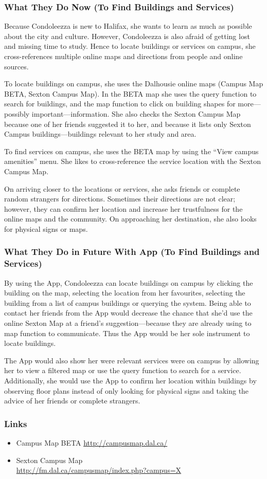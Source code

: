 \documentclass{article}
\begin{document}
\subsubsection{What They Do Now (To Find Buildings and Services)}

Because Condoleezza is new to Halifax, she wants to learn as much as possible
about the city and culture. However, Condoleezza is also afraid of getting lost
and missing time to study. Hence to locate buildings or services on campus, she
cross-references multiple online maps and directions from people and online
sources. 

To locate buildings on campus, she uses the Dalhousie online maps (Campus Map
BETA, Sexton Campus Map). In the BETA map she uses the query function to search
for buildings, and the map function to click on building shapes for
more—possibly important—information. She also checks the Sexton Campus Map
because one of her friends suggested it to her, and because it lists only Sexton
Campus buildings—buildings relevant to her study and area. 

To find services on campus, she uses the BETA map by using the “View campus
amenities” menu. She likes to cross-reference the service location with the
Sexton Campus Map.

On arriving closer to the locations or services, she asks friends or complete
random strangers for directions. Sometimes their directions are not clear;
however, they can confirm her location and increase her trustfulness for the
online maps and the community. On approaching her destination, she also looks
for physical signs or maps.

\subsubsection{What They Do in Future With App (To Find Buildings and Services)}

By using the App, Condoleezza can locate buildings on campus by clicking the
building on the map, selecting the location from her favourites, selecting the
building from a list of campus buildings or querying the system. Being able to
contact her friends from the App would decrease the chance that she’d use the
online Sexton Map at a friend’s suggestion—because they are already using to map
function to communicate. Thus the App would be her sole instrument to locate
buildings.

The App would also show her were relevant services were on campus by allowing
her to view a filtered map or use the query function to search for a service.
Additionally, she would use the App to confirm her location within buildings by
observing floor plans instead of only looking for physical signs and taking the
advice of her friends or complete strangers.

\subsubsection{Links}
\begin{itemize}
\item Campus Map BETA \hfill                      \url{http://campusmap.dal.ca/}
\item Sexton Campus Map \\
                      \hfill \url{http://fm.dal.ca/campusmap/index.php?campus=X}
\end{itemize}
\end{document}

